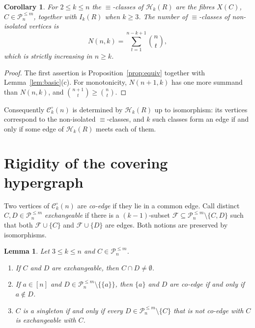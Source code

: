 \documentclass{amsart}
\newtheorem{lemma}[theorem]{Lemma}
\newtheorem{corollary}[theorem]{Corollary}
\theoremstyle{definition}
\theoremstyle{remark}
\newcommand{\cC}{\mathcal{C}}
\newcommand{\cF}{\mathcal{F}}
\newcommand{\cP}{\mathcal{P}}
\newcommand{\cH}{\mathcal{H}}
\newcommand{\nn}{[n]}
\begin{document}
\begin{corollary}\label{cor:classes}
For $2\le k\le n$ the $\equiv$-classes of $\cH_k(R)$ are the fibres $X(C)$, $C\in\cP_n^{\le m}$, together with $I_k(R)$ when $k\ge 3$. The number of $\equiv$-classes of non-isolated vertices is
\[
N(n,k)=\sum_{t=1}^{n-k+1}\binom nt ,
\]
which is strictly increasing in $n\ge k$.
\end{corollary}

\begin{proof}
The first assertion is Proposition~\ref{prop:equiv} together with Lemma~\ref{lem:basic}(c). For monotonicity, $N(n+1,k)$ has one more summand than $N(n,k)$, and $\binom{n+1}t\ge\binom nt$.
\end{proof}

Consequently $\cC_k^\circ(n)$ is determined by $\cH_k(R)$ up to isomorphism: its vertices correspond to the non-isolated $\equiv$-classes, and $k$ such classes form an edge if and only if some edge of $\cH_k(R)$ meets each of them.

\section{Rigidity of the covering hypergraph}\label{sec:rigid}

Two vertices of $\cC_k^\circ(n)$ are \emph{co-edge} if they lie in a common edge. Call distinct $C,D\in\cP_n^{\le m}$ \emph{exchangeable} if there is a $(k-1)$-subset $\cF\subseteq\cP_n^{\le m}\setminus\{C,D\}$ such that both $\cF\cup\{C\}$ and $\cF\cup\{D\}$ are edges. Both notions are preserved by isomorphisms.

\begin{lemma}\label{lem:singletons}
Let $3\le k\le n$ and $C\in\cP_n^{\le m}$.
\begin{enumerate}
\item[(a)] If $C$ and $D$ are exchangeable, then $C\cap D\ne\emptyset$.
\item[(b)] If $a\in\nn$ and $D\in\cP_n^{\le m}\setminus\{\{a\}\}$, then $\{a\}$ and $D$ are co-edge if and only if $a\notin D$.
\item[(c)] $C$ is a singleton if and only if every $D\in\cP_n^{\le m}\setminus\{C\}$ that is not co-edge with $C$ is exchangeable with $C$.
\end{enumerate}
\end{lemma}
\end{document}
